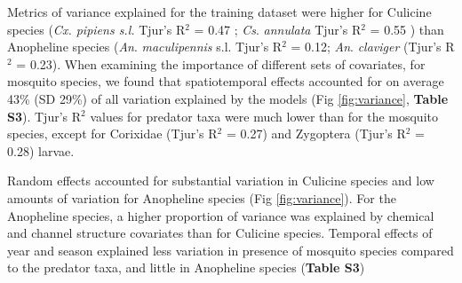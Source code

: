 \documentclass[lineno,sn-basic]{sn-jnl}%
\begin{document}
Metrics of variance explained for the training dataset were higher for Culicine species (\textit{Cx. pipiens s.l.} Tjur’s R$ ^{2} $ = 0.47 ; \textit{Cs}. \textit{annulata} Tjur’s R$ ^{2} $ = 0.55 ) than Anopheline species (\textit{An}. \textit{maculipennis} s.l. Tjur’s R$ ^{2} $ = 0.12; \textit{An}. \textit{claviger} (Tjur’s R$ ^{2} $ = 0.23). When examining the importance of different sets of covariates, for mosquito species, we found that spatiotemporal effects accounted for on average 43\% (SD 29\%) of all variation explained by the models (Fig \ref{fig:variance}, \textbf{Table S3}). Tjur’s R$ ^{2} $ values for predator taxa were much lower than for the mosquito species, except for Corixidae (Tjur’s R$ ^{2} $ = 0.27) and Zygoptera (Tjur’s R$ ^{2} $ = 0.28) larvae. 

Random effects accounted for substantial variation in Culicine species and low amounts of variation for Anopheline species (Fig \ref{fig:variance}). For the Anopheline species, a higher proportion of variance was explained by chemical and channel structure covariates than for Culicine species. Temporal effects of year and season explained less variation in presence of mosquito species compared to the predator taxa, and little in Anopheline species (\textbf{Table S3})
\end{document}
